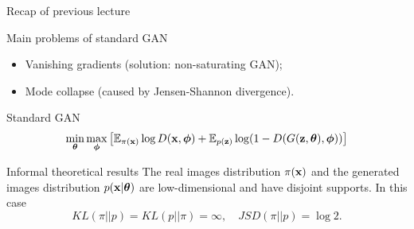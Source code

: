 \begin{frame}{Recap of previous lecture}
	\begin{block}{Main problems of standard GAN}
		\begin{itemize}
			\item Vanishing gradients (solution: non-saturating GAN);
			\item Mode collapse (caused by Jensen-Shannon divergence).
		\end{itemize}
	\end{block}
	\begin{block}{Standard GAN}
		\vspace{-0.7cm}
		\[
			\min_{\boldsymbol{\theta}} \max_{\boldsymbol{\phi}} \left[ \mathbb{E}_{\pi(\mathbf{x})} \log D(\mathbf{x}, \boldsymbol{\phi}) + \mathbb{E}_{p(\mathbf{z})} \log (1 - D(G(\mathbf{z}, \boldsymbol{\theta}), \boldsymbol{\phi})) \right]
		\]
		\vspace{-0.7cm}
	\end{block}
	\vspace{-0.1cm}
	\begin{block}{Informal theoretical results}
		The real images distribution $\pi(\mathbf{x})$ and the generated images distribution $p(\mathbf{x} | \boldsymbol{\theta})$ are low-dimensional and have disjoint supports. In this case
		\vspace{-0.3cm}
		\[
			KL(\pi || p) = KL(p || \pi) = \infty, \quad JSD(\pi || p) = \log 2.
		\]
		\end{block}
\end{frame}
